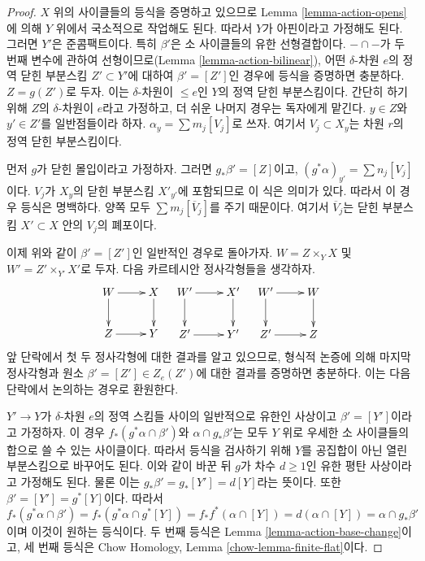 \begin{proof}
$X$ 위의 사이클들의 등식을 증명하고 있으므로 Lemma
\ref{lemma-action-opens}에 의해 $Y$ 위에서 국소적으로 작업해도 된다.
따라서 $Y$가 아핀이라고 가정해도 된다. 그러면 $Y'$은 준콤팩트이다.
특히 $\beta'$은 소 사이클들의 유한 선형결합이다. $- \cap -$가 두 번째
변수에 관하여 선형이므로(Lemma \ref{lemma-action-bilinear}), 어떤
$\delta$-차원 $e$의 정역 닫힌 부분스킴 $Z' \subset Y'$에 대하여
$\beta' = [Z']$인 경우에 등식을 증명하면 충분하다. $Z = g(Z')$로
두자. 이는 $\delta$-차원이 $\leq e$인 $Y$의 정역 닫힌 부분스킴이다.
간단히 하기 위해 $Z$의 $\delta$-차원이 $e$라고 가정하고, 더 쉬운
나머지 경우는 독자에게 맡긴다. $y \in Z$와 $y' \in Z'$를 일반점들이라
하자. $\alpha_y = \sum m_j[V_j]$로 쓰자. 여기서
$V_j \subset X_y$는 차원 $r$의 정역 닫힌 부분스킴이다.

\medskip\noindent
먼저 $g$가 닫힌 몰입이라고 가정하자. 그러면 $g_*\beta' = [Z]$이고,
$(g^*\alpha)_{y'} = \sum n_j[V_j]$이다. $V_j$가 $X_y$의 닫힌
부분스킴 $X'_{y'}$에 포함되므로 이 식은 의미가 있다. 따라서 이 경우
등식은 명백하다. 양쪽 모두 $\sum m_j[\overline{V}_j]$를 주기 때문이다.
여기서 $\overline{V}_j$는 닫힌 부분스킴 $X' \subset X$ 안의
$V_j$의 폐포이다.

\medskip\noindent
이제 위와 같이 $\beta' = [Z']$인 일반적인 경우로 돌아가자.
$W = Z \times_Y X$ 및 $W' = Z' \times_{Y'} X'$로 두자. 다음
카르테시안 정사각형들을 생각하자.
$$
\xymatrix{
W \ar[r] \ar[d] & X \ar[d] \\
Z \ar[r] & Y
}
\quad
\xymatrix{
W' \ar[r] \ar[d] & X' \ar[d] \\
Z' \ar[r] & Y'
}
\quad
\xymatrix{
W' \ar[r] \ar[d] & W \ar[d] \\
Z' \ar[r] & Z
}
$$
앞 단락에서 첫 두 정사각형에 대한 결과를 알고 있으므로, 형식적
논증에 의해 마지막 정사각형과 원소
$\beta' = [Z'] \in Z_e(Z')$에 대한 결과를 증명하면 충분하다. 이는
다음 단락에서 논의하는 경우로 환원한다.

\medskip\noindent
$Y' \to Y$가 $\delta$-차원 $e$의 정역 스킴들 사이의 일반적으로 유한인
사상이고 $\beta' = [Y']$이라고 가정하자. 이 경우
$f_*(g^*\alpha \cap \beta')$와 $\alpha \cap g_*\beta'$는 모두 $Y$ 위로
우세한 소 사이클들의 합으로 쓸 수 있는 사이클이다. 따라서 등식을
검사하기 위해 $Y$를 공집합이 아닌 열린 부분스킴으로 바꾸어도 된다.
이와 같이 바꾼 뒤 $g$가 차수 $d \geq 1$인 유한 평탄 사상이라고
가정해도 된다. 물론 이는 $g_*\beta' = g_*[Y'] = d[Y]$라는 뜻이다.
또한 $\beta' = [Y'] = g^*[Y]$이다. 따라서
$$
f_*(g^*\alpha \cap \beta') =
f_*(g^*\alpha \cap g^*[Y]) =
f_*f^*(\alpha \cap [Y]) =
d (\alpha \cap [Y]) =
\alpha \cap g_*\beta'
$$
이며 이것이 원하는 등식이다. 두 번째 등식은 Lemma
\ref{lemma-action-base-change}이고, 세 번째 등식은 Chow Homology,
Lemma \ref{chow-lemma-finite-flat}이다.
\end{proof}



